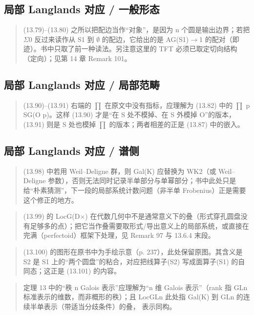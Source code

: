 \subsection*{局部 Langlands 对应 / 一般形态}
\begin{quote}\small
(13.79)--(13.80) 之所以把配边当作“对象”，是因为 n 个圆是输出边界；若把 $\Sigma$0 反过来读作从 S1 到 $\emptyset$ 的配边，它给出的是 AG(S1)$\to$1 的配对（即迹）。书中只取了前一种读法。另注意这里的 TFT 必须已取定切向结构（定向）；见第 14 章 Remark 101。
\end{quote}

\subsection*{局部 Langlands 对应 / 局部范畴}
\begin{quote}\small
(13.90)--(13.91) 右端的 $\prod$ 在原文中没有指标，应理解为 (13.82) 中的 $\prod$ p SG(O p)。这样 (13.90) 才是“在 S 处不模掉、在 S 外模掉 O”的版本，(13.91) 则是 S 处也模掉 $\prod$ 的版本；两者相差的正是 (13.87) 中的嵌入。
\end{quote}

\subsection*{局部 Langlands 对应 / 谱侧}
\begin{quote}\small
(13.98) 中若用 Weil–Deligne 群，则 Gal(K) 应替换为 WK2（或 Weil–Deligne 参数），否则无法同时记录半单部分与单幂部分；书中此处只是给“朴素猜测”，下一段的局部系统计数问题（非半单 Frobenius）正是需要这个修正的地方。
\end{quote}

\begin{quote}\small
(13.99) 的 LocG(D$\times$) 在代数几何中不是通常意义下的叠（形式穿孔圆盘没有足够多的点）；把它当作叠需要取形式/导出意义上的局部系统，或直接在完满（perfectoid）框架下处理，见 Remark 97 与 13.6.4 末段。
\end{quote}

\begin{quote}\small
(13.100) 的图形在原书中为手绘示意（p. 237），此处保留原图。其含义是 S2 是 S1 上的“两个圆盘”的粘合，对应把线算子(S2) 写成面算子(S1) 的自同态；这正是 (13.101) 的内容。
\end{quote}

\begin{quote}\small
定理 13 中的“秩 n Galois 表示”应理解为“n 维 Galois 表示”（rank 指 GLn 标准表示的维数，而非概形的秩）；且 LocGLn 此处指 Gal(K) 到 GLn 的连续半单表示（带适当分歧条件）的叠， 表示同构。
\end{quote}

